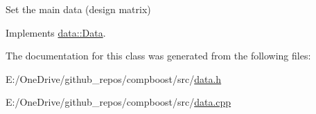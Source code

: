 Set the main data (design matrix) 



Implements \mbox{\hyperlink{classdata_1_1_data_a0e928c49b31f803e7984cc24e2f73f70}{data\+::\+Data}}.



The documentation for this class was generated from the following files\+:\begin{DoxyCompactItemize}
\item 
E\+:/\+One\+Drive/github\+\_\+repos/compboost/src/\mbox{\hyperlink{data_8h}{data.\+h}}\item 
E\+:/\+One\+Drive/github\+\_\+repos/compboost/src/\mbox{\hyperlink{data_8cpp}{data.\+cpp}}\end{DoxyCompactItemize}
